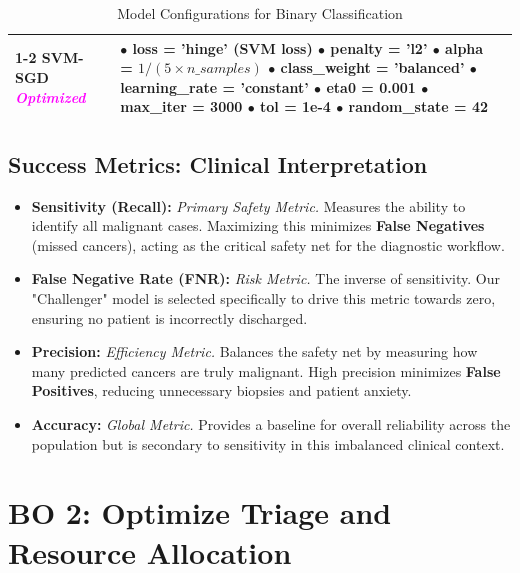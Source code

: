\begin{table}[H]
\begin{tabular}{|p{}|p{}|p{}|}
\cline{1-2}
\textbf{SVM-SGD} \newline \textit{\textcolor{magenta}{Optimized}} & 
$\bullet$ loss = 'hinge' (SVM loss) \newline
$\bullet$ penalty = 'l2' \newline
$\bullet$ alpha = $1/(5 \times n\_samples)$ \newline
$\bullet$ class\_weight = 'balanced' \newline
$\bullet$ learning\_rate = 'constant' \newline
$\bullet$ eta0 = 0.001 \newline
$\bullet$ max\_iter = 3000 \newline
$\bullet$ tol = 1e-4 \newline
$\bullet$ random\_state = 42 
& \\
\hline
\end{tabular}
\caption{Model Configurations for Binary Classification}
\label{tab:model_configurations}
\end{table}

\subsection{Success Metrics: Clinical Interpretation}
\begin{itemize}
    \item \textbf{Sensitivity (Recall):} \textit{Primary Safety Metric.} Measures the ability to identify all malignant cases. Maximizing this minimizes \textbf{False Negatives} (missed cancers), acting as the critical safety net for the diagnostic workflow.
    \item \textbf{False Negative Rate (FNR):} \textit{Risk Metric.} The inverse of sensitivity. Our "Challenger" model is selected specifically to drive this metric towards zero, ensuring no patient is incorrectly discharged.
    \item \textbf{Precision:} \textit{Efficiency Metric.} Balances the safety net by measuring how many predicted cancers are truly malignant. High precision minimizes \textbf{False Positives}, reducing unnecessary biopsies and patient anxiety.
    \item \textbf{Accuracy:} \textit{Global Metric.} Provides a baseline for overall reliability across the population but is secondary to sensitivity in this imbalanced clinical context.
\end{itemize}

\section{BO 2: Optimize Triage and Resource Allocation}

